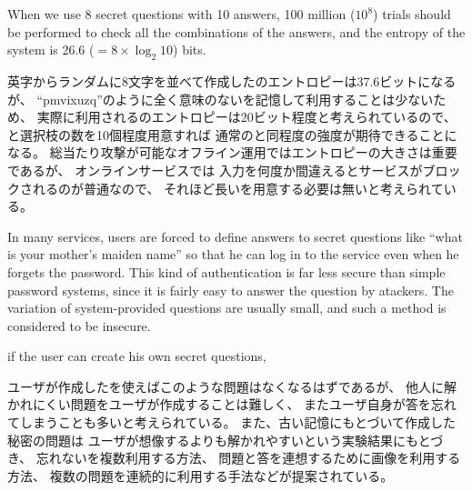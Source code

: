 \documentclass{article}
\begin{document}

When we use 8 secret questions with 10 answers,
100 million ($10^8$) trials should be performed to check
all the combinations of the answers,
and the entropy of the system is 26.6 ($ = 8 \times \log_2 10$) bits.

英字からランダムに8文字を並べて作成した{\PW}のエントロピーは37.6ビットになるが、
``\textsf{pmvixuzq}''のように全く意味のない{\PW}を記憶して利用することは少ないため、
実際に利用される{\PW}のエントロピーは20ビット程度と考えられているので\cite{NIST}、
{\SQ}と選択枝の数を10個程度用意すれば
通常の{\PW}と同程度の強度が期待できることになる。
%
総当たり攻撃が可能なオフライン運用ではエントロピーの大きさは重要であるが、
オンラインサービスでは
{\PW}入力を何度か間違えるとサービスがブロックされるのが普通なので、
それほど長い{\PW}を用意する必要は無いと考えられている\cite{Florencio:2007:SWP:1361419.1361429}。


In many services, users are forced to define answers to secret questions like
``what is your mother's maiden name''
so that he can log in to the service even when he forgets the password.
This kind of authentication is far less secure than simple password systems,
since it is fairly easy to answer the question by atackers.
The variation of system-provided questions are usually small, and
such a method is considered to be insecure\cite{Rabkin:2008:PKQ:1408664.1408667}.

if the user can create his own secret questions,

ユーザが作成した{\SQ}を使えばこのような問題はなくなるはずであるが、
他人に解かれにくい問題をユーザが作成することは難しく、
またユーザ自身が答を忘れてしまうことも多いと考えられている\cite{Just:2009:PCC:1572532.1572543}\cite{Schechter:2009:NSM:1607723.1608145}。
%
また、古い記憶にもとづいて作成した秘密の問題は
ユーザが想像するよりも解かれやすいという実験結果にもとづき、
忘れない{\SQ}を複数利用する方法、
問題と答を連想するために画像を利用する方法、
複数の問題を連続的に利用する手法などが提案されている\cite{Renaud:2010:PQE:2146303.2146318}。
\end{document}
